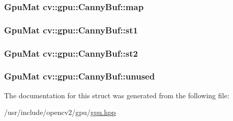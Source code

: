 \hypertarget{structcv_1_1gpu_1_1CannyBuf_ae0eff470f375924982d14c6609495ece}{
\subsubsection[{map}]{\setlength{\rightskip}{0pt plus 5cm}Gpu\-Mat cv\-::gpu\-::\-Canny\-Buf\-::map}}\label{structcv_1_1gpu_1_1CannyBuf_ae0eff470f375924982d14c6609495ece}
\hypertarget{structcv_1_1gpu_1_1CannyBuf_ac14d75c111051f0a003036cb823b73aa}{
\subsubsection[{st1}]{\setlength{\rightskip}{0pt plus 5cm}Gpu\-Mat cv\-::gpu\-::\-Canny\-Buf\-::st1}}\label{structcv_1_1gpu_1_1CannyBuf_ac14d75c111051f0a003036cb823b73aa}
\hypertarget{structcv_1_1gpu_1_1CannyBuf_ab96fb51ce7d074263c5c9b503c38006e}{
\subsubsection[{st2}]{\setlength{\rightskip}{0pt plus 5cm}Gpu\-Mat cv\-::gpu\-::\-Canny\-Buf\-::st2}}\label{structcv_1_1gpu_1_1CannyBuf_ab96fb51ce7d074263c5c9b503c38006e}
\hypertarget{structcv_1_1gpu_1_1CannyBuf_a236ec0eda5749a86dc885b9c26c58d4e}{
\subsubsection[{unused}]{\setlength{\rightskip}{0pt plus 5cm}Gpu\-Mat cv\-::gpu\-::\-Canny\-Buf\-::unused}}\label{structcv_1_1gpu_1_1CannyBuf_a236ec0eda5749a86dc885b9c26c58d4e}


The documentation for this struct was generated from the following file\-:\begin{DoxyCompactItemize}
\item 
/usr/include/opencv2/gpu/\hyperlink{gpu_2gpu_8hpp}{gpu.\-hpp}\end{DoxyCompactItemize}
